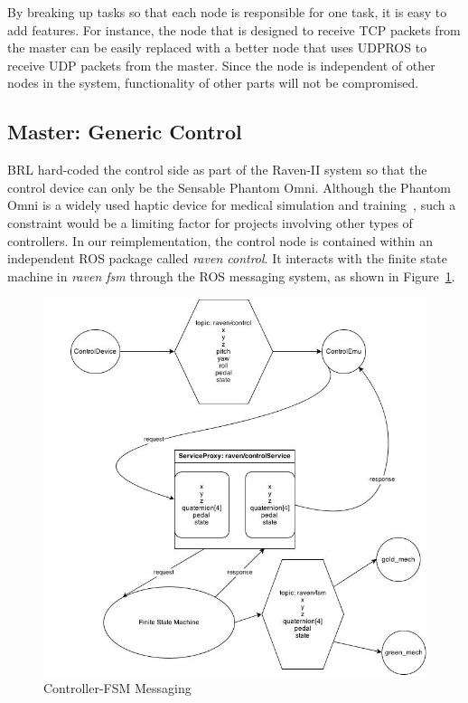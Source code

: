 \documentclass[letterpaper,twocolumn,10pt]{article}
\begin{document}
By breaking up tasks so that each node is responsible for one task, 
it is easy to add features. For instance, the node that is designed 
to receive TCP packets from the master can be easily replaced with 
a better node that uses UDPROS to receive UDP packets from the master. 
Since the node is independent of other nodes in the system, 
functionality of other parts will not be compromised.

\subsection{Master: Generic Control}

BRL hard-coded the control side as part of the Raven-II system so that
the control device can only be the Sensable Phantom Omni. Although the
Phantom Omni is a widely used haptic device for medical simulation and
training~\cite{2}, such a constraint would be a limiting factor for projects
involving other types of controllers. In our reimplementation, the
control node is contained within an independent ROS package called
\emph{raven control}. It interacts with the finite state machine in
\emph{raven fsm} through the ROS messaging system, as shown in
Figure~\ref{fig:control_diagram}.

\begin{figure}[h]
  \includegraphics[width=1.0\columnwidth]{ControlDiagram.jpg}
  \caption{Controller-FSM Messaging}
  \label{fig:control_diagram}
\end{figure}
\end{document}
